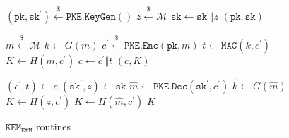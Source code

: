 \documentclass[journal=tches,submission]{iacrtrans}
\newcommand{\pke}{\texttt{PKE}}
\newcommand{\keygen}{\texttt{KeyGen}}
\newcommand{\encrypt}{\texttt{Enc}}
\newcommand{\decrypt}{\texttt{Dec}}
\newcommand{\kem}{\texttt{KEM}}
\newcommand{\encap}{\texttt{Encap}}
\newcommand{\decap}{\texttt{Decap}}
\newcommand{\etm}{\texttt{EtM}}  %
\newcommand{\mac}{\texttt{MAC}}
\newcommand{\pk}{\texttt{pk}}
\newcommand{\sk}{\texttt{sk}}
\newcommand{\leftsample}{\stackrel{\$}{\leftarrow}}
\begin{document}
\begin{figure}[H]
    \centering
    \begin{minipage}[t]{0.5\textwidth}
        \begin{algorithm}[H]
            \caption*{$\kem_\etm.\keygen()$}
            \begin{algorithmic}[1]
                \State $(\pk, \sk^\prime) \leftsample \pke\texttt{.}\keygen()$
                \State $z \leftsample \mathcal{M}$
                \State $\sk \leftarrow \sk^\prime \Vert z$
                \State \Return $(\pk, \sk)$
            \end{algorithmic}
        \end{algorithm}
        \begin{algorithm}[H]
            \caption*{$\kem_\etm.\encap(\pk)$}
            \begin{algorithmic}[1]
                \State $m \leftsample \mathcal{M}$
                \State $k \leftarrow G(m)$
                \State $c^\prime \leftsample \pke\texttt{.}\encrypt(\pk, m)$
                \State $t \leftarrow \mac(k, c^\prime)$
                \State $K \leftarrow H(m, c^\prime)$
                \State $c \leftarrow c^\prime \Vert t$
                \State \Return $(c, K)$
            \end{algorithmic}
        \end{algorithm}
    \end{minipage}\hfill
    \begin{minipage}[t]{0.49\textwidth}
        \begin{algorithm}[H]
            \caption*{$\kem_\etm.\decap(\sk, c)$}
            \begin{algorithmic}[1]
                \State $(c^\prime, t) \leftarrow c$
                \State $(\sk^\prime, z) \leftarrow \sk$
                \State $\hat{m} \leftarrow \pke\texttt{.}\decrypt(\sk^\prime, c^\prime)$
                \State $\hat{k} \leftarrow G(\hat{m})$
                \If{$\mac(\hat{k}, c^\prime) \neq t$}
                    \State $K \leftarrow H(z, c^\prime)$
                \Else
                    \State $K \leftarrow H(\hat{m}, c^\prime)$
                \EndIf
                \State \Return $K$
            \end{algorithmic}
        \end{algorithm}
    \end{minipage}
    \caption{$\kem_\etm$ routines}\label{fig:etm-routines} 
\end{figure}
\end{document}

